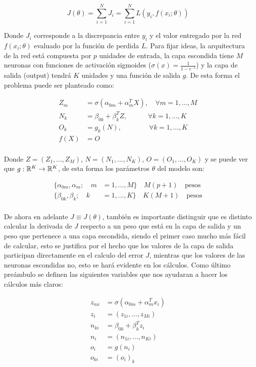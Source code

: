 \begin{equation}
J(\theta) = \sum_{i=1}^N J_i = \sum_{i=1}^N L(y_i, f(x_i;\theta))
\end{equation}

Donde $J_i$ corresponde a la discrepancia entre $y_i$ y el valor entregado por la red $f(x_i;\theta)$ evaluado por la función de perdida $L$. Para fijar ideas, la arquitectura de la red está compuesta por $p$ unidades de entrada, la capa escondida tiene $M$ neuronas con funciones de activación sigmoides ($\sigma(x)=\frac{1}{1-e^{-t}}$) y la capa de salida (output) tendrá $K$ unidades y una función de salida $g$. De esta forma el problema puede ser planteado como:

\begin{align}
	Z_m &= \sigma(\alpha_{0m} + \alpha_{m}^TX), \quad \forall m=1,...,M\\
	N_k &= \beta_{0k} + \beta_k^TZ, \quad\quad\quad \forall k=1,...,K\\
	O_k &= g_k(N), \quad\quad\quad\quad \forall k=1,...,K\\
	f(X) &= O\\
\end{align}

Donde $Z=(Z_1,...,Z_M)$, $N=(N_1,...,N_K)$, $O=(O_1,...,O_K)$ y se puede ver que $g:{\mathbb R}^K \rightarrow {\mathbb R}^K$, de esta forma los parámetros $\theta$ del modelo son:

\begin{align*}
\{\alpha_{0m}, \alpha_m; \quad m &= 1,...,M \} \quad M(p+1) \quad \text{pesos}\\
\{\beta_{0k}, \beta_k; \quad k &= 1,...,K \} \quad K(M+1) \quad \text{pesos}\\
\end{align*}

De ahora en adelante $J\equiv J(\theta)$, también es importante distinguir que es distinto calcular la derivada de $J$ respecto a un peso que está en la capa de salida y un peso que pertenece a una capa escondida, siendo el primer caso mucho más fácil de calcular, esto se justifica por el hecho que los valores de la capa de salida participan directamente en el calculo del error $J$, mientras que los valores de las neuronas escondidas no, esto se hará evidente en los cálculos. Como último preámbulo se definen las siguientes variables que nos ayudaran a hacer los cálculos más claros:

\begin{align*}
z_{mi} &= \sigma(\alpha_{0m} + \alpha_{m}^Tx_i)\\
z_i &= (z_{1i},...,z_{Mi})\\
n_{ki} &= \beta_{0k} + \beta_k^Tz_i\\
n_i &= (n_{1i},...,n_{Ki})\\
o_{i} &= g(n_i)\\
o_{ki} &= (o_i)_k\\
\end{align*}

